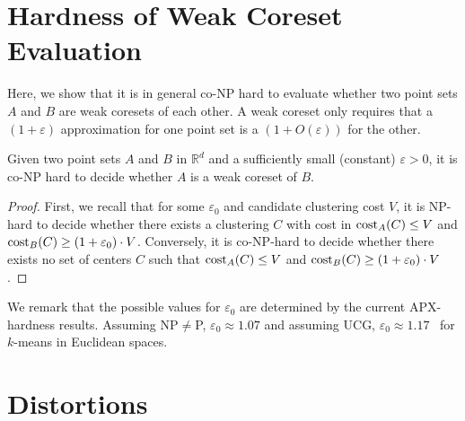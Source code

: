 \section{Hardness of Weak Coreset Evaluation}

Here, we show that it is in general co-NP hard to evaluate whether two point sets $A$ and $B$ are weak coresets of each other. A weak coreset only requires that a $(1+\varepsilon)$ approximation for one point set is a $(1+O(\varepsilon))$ for the other.


\begin{proposition}
\label{prop:hardness}
Given two point sets $A$ and $B$ in $\mathbb{R}^d$ and a sufficiently small (constant) $\varepsilon>0$, it is co-NP hard to decide whether $A$ is a weak coreset of $B$.
\end{proposition}
\begin{proof}
First, we recall that for some $\varepsilon_0$ and candidate clustering cost $V$, it is NP-hard to decide whether there exists a clustering $C$ with cost in $\text{cost}_A(C)\leq V$ and $\text{cost}_B(C)\geq (1+\varepsilon_0)\cdot V$.
Conversely, it is co-NP-hard to decide whether there exists no set of centers $C$ such that $\text{cost}_A(C)\leq V$ and $\text{cost}_B(C) \geq (1+\varepsilon_0)\cdot V$.
\end{proof}

We remark that the possible values for $\varepsilon_0$ are determined by the current APX-hardness results. Assuming NP$\neq$P, $\varepsilon_0\approx 1.07$ and assuming UCG, $\varepsilon_0 \approx 1.17$~\cite{Cohen-AddadSL21,Cohen-AddadS19} for $k$-means in Euclidean spaces.




\section{Distortions}



